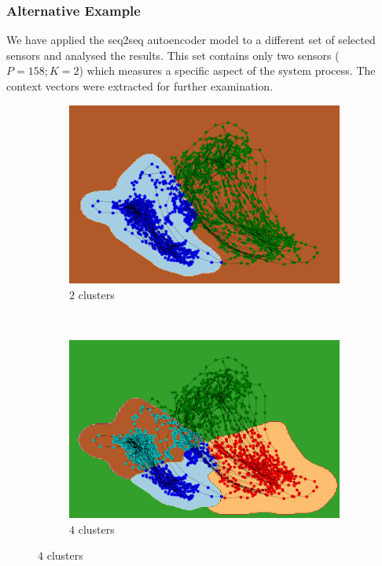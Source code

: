 \documentclass[11pt]{article} %
\theoremstyle{plain}
\theoremstyle{definition}
\begin{document}
\subsubsection {Alternative Example}

We have applied the seq2seq autoencoder model to a different set of selected sensors and analysed the results. This set contains only two sensors (\(P=158; K=2\)) which measures a specific aspect of the system process. The context vectors were extracted for further examination.

\begin{figure}[H]
	\centering
	
	\begin{subfigure}[b]{0.48\textwidth}
		\includegraphics[width=\textwidth]{ex2_pca_cluster_2.PNG}
		\caption{\(2\) clusters}
		\label{fig:ex2_pca_cluster_2}
	\end{subfigure}
	~
	\begin{subfigure}[b]{0.48\textwidth}
		\includegraphics[width=\textwidth]{ex2_pca_cluster_4.PNG}
		\caption{\(4\) clusters}
		\label{fig:ex2_pca_cluster_4}
	\end{subfigure}
	

\end{figure}
\end{document}
